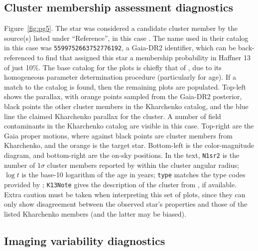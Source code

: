 \documentclass[12pt,twocolumn,tighten]{aastex62}
\begin{document}
\subsection{Cluster membership assessment diagnostics}
\label{sec:pg5}

Figure~\ref{fig:pg5}.
The star was considered a candidate cluster member by the source(s)
listed under ``Reference'', in this case
\citet{cantat-gaudin_gaia_2018}.  The name used in their catalog in
this case was \texttt{5599752663752776192}, a Gaia-DR2 identifier,
which can be back-referenced to find that
\citet{cantat-gaudin_gaia_2018} assigned this star a membership
probability in Haffner 13 of just 10\%.  The base catalog for the
plots is chiefly that of \citet{Kharchenko_et_al_2013}, due to its
homogeneous parameter determination procedure (particularly for age).
If a match to the \citet{Kharchenko_et_al_2013} catalog is found, then
the remaining plots are populated.  Top-left shows the parallax, with
orange points sampled from the Gaia-DR2 posterior, black points the
other cluster members in the Kharchenko catalog, and the blue line the
claimed Kharchenko parallax for the cluster.  A number of field
contaminants in the Kharchenko catalog are visible in this case.
Top-right are the Gaia proper motions, where against black points are
cluster members from Kharchenko, and the orange is the target star.
Bottom-left is the color-magnitude diagram, and bottom-right are the
on-sky positions.  In the text, \texttt{N1sr2} is the number of
$1\sigma$ cluster members reported by \citet{Kharchenko_et_al_2013}
within the cluster angular radius; $\log t$ is the base-10 logarithm
of the age in years; \texttt{type} matches the type codes provided by
\citet{Kharchenko_et_al_2013}; \texttt{K13Note} gives the description
of the cluster from \citet{Kharchenko_et_al_2013}, if available.
Extra caution must be taken when interpreting this set of plots, since
they can only show disagreement between the observed star's properties
and those of the listed Kharchenko members (and the latter may be
biased).

\subsection{Imaging variability diagnostics}
\label{sec:pg6}
\end{document}
